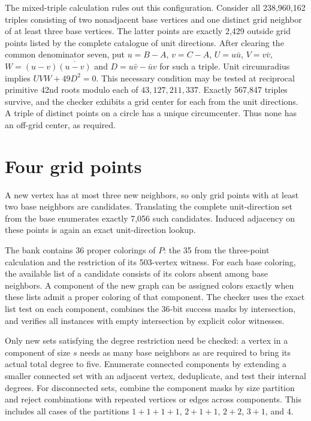 \documentclass[11pt,letterpaper]{article}
\begin{document}
The mixed-triple calculation rules out this configuration.
Consider all 238,960,162 triples consisting of two nonadjacent
base vertices and one distinct grid neighbor of at least three
base vertices. The latter points are exactly 2,429 outside grid
points listed by the complete catalogue of unit directions.
After clearing the common denominator seven, put
\(u=B-A\), \(v=C-A\), \(U=u\bar u\), \(V=v\bar v\),
\(W=(u-v)\overline{(u-v)}\) and \(D=u\bar v-\bar u v\)
for such a triple. Unit circumradius implies
\(UVW+49D^2=0\). This necessary condition may be tested
at reciprocal primitive 42nd roots modulo each of
\(43,127,211,337\). Exactly 567,847 triples survive, and
the checker exhibits a grid center for each from the unit
directions. A triple of distinct points on a circle has a
unique circumcenter. Thus none has an off-grid center, as
required.

\section{Four grid points}
A new vertex has at most three new neighbors, so only grid points
with at least two base neighbors are candidates. Translating
the complete unit-direction set from the base enumerates exactly
7,056 such candidates. Induced adjacency on these points is
again an exact unit-direction lookup.

The bank contains 36 proper colorings of \(P\): the 35 from
the three-point calculation and the restriction of its
503-vertex witness. For each base coloring, the available list of
a candidate consists of its colors absent among base neighbors.
A component of the new graph can be assigned colors exactly when
these lists admit a proper coloring of that component. The checker
uses the exact list test on each component, combines the
36-bit success masks by intersection, and verifies all instances
with empty intersection by explicit color witnesses.

Only new sets satisfying the degree restriction need be checked:
a vertex in a component of size \(s\) needs as many base neighbors
as are required to bring its actual total degree to five.
Enumerate connected components by extending a smaller connected
set with an adjacent vertex, deduplicate, and test their internal
degrees. For disconnected sets, combine the component masks by
size partition and reject combinations with repeated vertices or
edges across components. This includes all cases of the
partitions \(1+1+1+1\), \(2+1+1\), \(2+2\), \(3+1\), and \(4\).
\end{document}
